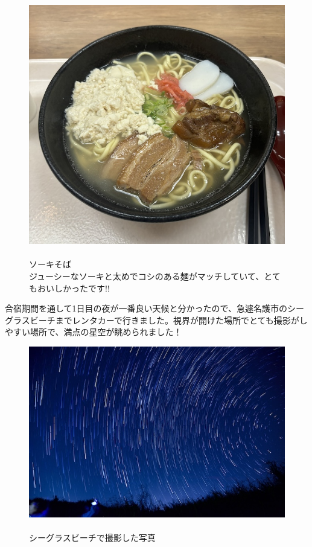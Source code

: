 \documentclass[../main]{subfiles}
\begin{document}
\begin{figure}[H]
  \begin{minipage}[b]{0.48\columnwidth}
    \caption{\\
    ソーキそば\\
    ジューシーなソーキと太めでコシのある麺がマッチしていて、とてもおいしかったです!!
    }
  \end{minipage}
  \hspace{0.04\columnwidth} %
  \begin{minipage}[b]{0.48\columnwidth}
    \centering
    \includegraphics[width=0.7\columnwidth]{figure/okinawasoba.jpg}
  \end{minipage}
\end{figure}

合宿期間を通して1日目の夜が一番良い天候と分かったので、急遽名護市のシーグラスビーチまでレンタカーで行きました。視界が開けた場所でとても撮影がしやすい場所で、満点の星空が眺められました！
\begin{figure}[H]
  \begin{minipage}[b]{0.48\columnwidth}
    \centering
    \includegraphics[width=\columnwidth]{figure/hosi_suttakku_1nitime.jpg}
  \end{minipage}
  \hspace{0.04\columnwidth} %
  \begin{minipage}[b]{0.48\columnwidth}
    \caption{\\
    シーグラスビーチで撮影した写真
    }
  \end{minipage}
\end{figure}
\end{document}
